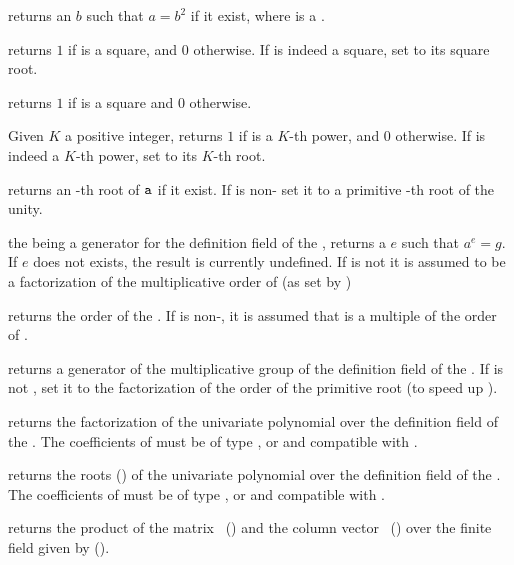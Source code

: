  returns an  $b$ such that $a=b^2$ if
it exist, where  is a .

 returns $1$ if  is a
square, and $0$ otherwise. If  is indeed a square, set  to its
square root.

 returns $1$ if  is a square and $0$
otherwise.

 Given $K$ a positive integer,
returns $1$ if  is a $K$-th power, and $0$ otherwise. If  is
indeed a $K$-th power, set  to its $K$-th root.

 returns an -th root of
${\tt a}$ if it exist. If  is non- set it to a primitive
-th root of the unity.

 the   being a
generator for the definition field of the  , returns a
 $e$ such that $a^e=g$.  If $e$ does not exists, the result is
currently undefined. If  is not  it is assumed to be a
factorization of the multiplicative order of  (as set by
)

 returns the order of the  .
If  is non-, it is assumed that  is a multiple of the
order of .

 returns a generator of the
multiplicative group of the definition field of the  .
If  is not , set it to the factorization of the order
of the primitive root (to speed up ).

 returns the factorization of the univariate
polynomial  over the definition field of the  . The
coefficients of  must be of type ,  or 
and compatible with .

 returns the roots ()
of the univariate polynomial  over the definition field of the
 . The coefficients of  must be of type ,
 or  and compatible with .

 returns the product of
the matrix~ () and the column vector~
() over the finite field given by  ().

